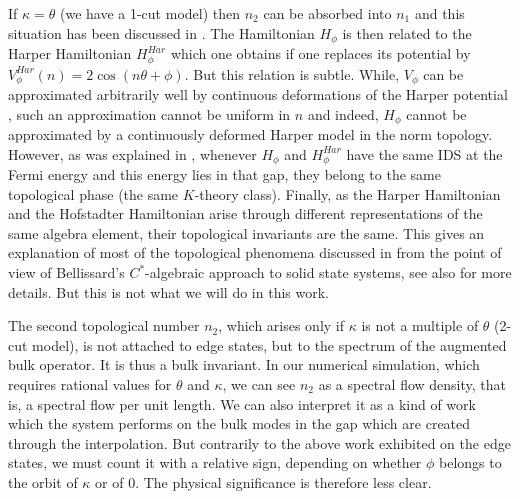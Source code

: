 \documentclass[11pt]{amsart}
\newcommand{\cut}{\kappa}
\begin{document}
If $\cut=\theta$ (we have a 1-cut model) then $n_2$ can be absorbed into $n_1$ and this situation has been discussed in \cite{kellendonk_prodan}. The Hamiltonian $H_\phi$ is then related to the Harper Hamiltonian $H^{Har}_\phi$ which one obtains if one replaces its potential by $V^{Har}_\phi(n) = 2\cos(n\theta+\phi)$. But this relation is subtle. While, %
$V_\phi$ can be approximated arbitrarily well by continuous deformations of the Harper potential \cite{kraus2012topological}, such an approximation cannot be uniform in $n$ and indeed, $H_\phi$ cannot be approximated by a continuously deformed Harper model in the norm topology. However, as was explained in \cite{kellendonk2024topological}, whenever  $H_\phi$ and $H^{Har}_\phi$ have the same IDS at the Fermi energy and this energy lies in that gap, they belong to the same topological phase (the same $K$-theory class). Finally, as the Harper Hamiltonian and the Hofstadter Hamiltonian arise through different representations of the same algebra element, their topological invariants are the same. This gives an explanation of most of the topological phenomena discussed in \cite{kraus2012topological,verbin2015topological,dana2014topologically,baboux2017measuring} from the point of view of Bellissard's $C^*$-algebraic approach to solid state systems, see also \cite{prodan2015virtual} for more details. 
But this is not what we will do in this work.


The second topological number $n_2$, which arises only if $\cut$ is not a multiple of $\theta$ (2-cut model), is not attached to edge states, but to the spectrum of the augmented bulk operator. It is thus a bulk invariant. 
In our numerical simulation, which requires rational values for $\theta$ and $\kappa$, we can see $n_2$ as a spectral flow density, that is, a spectral flow per unit length. We can also interpret it as a kind of work which the system performs on the bulk modes in the gap which are created through the interpolation. But contrarily to the above work exhibited on the edge states, we must count it with a relative sign, depending on whether $\phi$ belongs to the orbit of $\kappa$ or of $0$. The physical significance is therefore less clear. 
\end{document}
